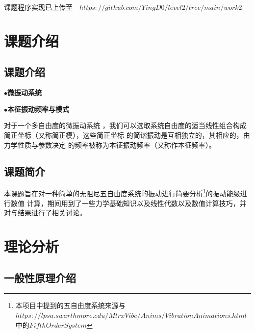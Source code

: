 \documentclass[11pt, a4paper, oneside]{ctexart}
\begin{document}
\vspace{35mm}\begin{center}
    \small{课题程序实现已上传至}\small{$\quad https://github.com/YingD0/level2/tree/main/work2$}
        
\end{center}

\newpage
{}
\setcounter{page}{1}
\tableofcontents
\newpage
\setcounter{page}{1}

\section{课题介绍}
\subsection{课题介绍}
{
    $\bullet$\textbf{微振动系统}




    \setlength{\parindent}{2em}$\bullet$\textbf{本征振动频率与模式}


    \setlength{\parindent}{3em}对于一个多自由度的微振动系统
    ，我们可以选取系统自由度的适当线性组合构成简正坐标（又称简正模），这些简正坐标
    的简谐振动是互相独立的，其相应的，由力学性质与参数决定
    的频率被称为本征振动频率（又称作本征频率）。

}
\subsection{课题简介}
{本课题旨在对一种简单的无阻尼五自由度系统的振动进行简要分析\footnote{本项目中提到的五自由度系统来源与$https://lpsa.swarthmore.edu/MtrxVibe/Anims/VibrationAnimations.html$中的$Fifth Order System$}的振动能级进行数值
计算，期间用到了一些力学基础知识以及线性代数以及数值计算技巧，并对与结果进行了相关讨论。}
\newpage
\section{理论分析}
\subsection{一般性原理介绍}
\end{document}
